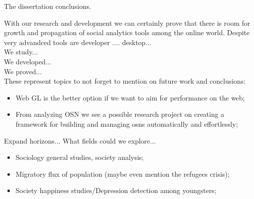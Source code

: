 The dissertation conclusions.

With our research and development we can certainly prove that there is room for growth and propagation of social analytics tools among the online world. Despite very advandced tools are developer .... desktop...
\\
We study...\\
We developed...\\
We proved...\\

These represent topics to not forget to mention on future work and conclusions:
\begin{itemize}
    \item Web GL is the better option if we want to aim for performance on the web;
    \item From analyzing OSN we see a possible research project on creating a framework for building
    and managing \glspl{osn} automatically and effortlessly;
\end{itemize}

Expand horizons... What fields could we explore...\\
\begin{itemize}
    \item Sociology general studies, society analysis;
    \item Migratory flux of population (maybe even mention the refugees crisis);
    \item Society happiness studies/Depression detection among youngsters;
\end{itemize}
